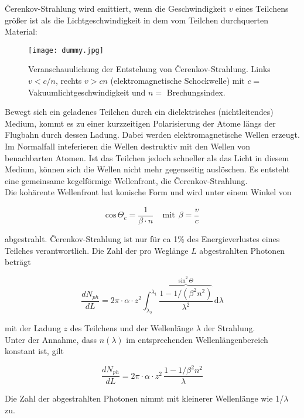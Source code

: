 \v{C}erenkov-Strahlung wird emittiert, wenn die Geschwindigkeit $v$ eines Teilchens größer ist als
die Lichtgeschwindigkeit in dem vom Teilchen durchquerten Material:

\begin{figure}[H]
	\centering
	\texttt{[image: dummy.jpg]}
	\caption{Veranschauulichung der Entstehung von \v{C}erenkov-Strahlung. Links $v<c/n$, rechts $v>cn$
	(elektromagnetische Schockwelle) mit $c=$ Vakuumlichtgeschwindigkeit und $n=$ Brechungsindex. }
\end{figure}

Bewegt sich ein geladenes Teilchen durch ein dielektrisches (nichtleitendes) Medium, kommt es zu
einer kurzzeitigen Polarisierung der Atome längs der Flugbahn durch dessen Ladung. Dabei werden
elektromagnetische Wellen erzeugt. Im Normalfall inteferieren die Wellen destruktiv mit den Wellen
von benachbarten Atomen. Ist das Teilchen jedoch schneller als das Licht in diesem Medium, können
sich die Wellen nicht mehr gegenseitig auslöschen. Es entsteht eine gemeinsame kegelförmige
Wellenfront, die \v{C}erenkov-Strahlung.
\\
Die kohärente Wellenfront hat konische Form und wird unter einem Winkel von 

\[\text{cos}\,\Theta_c=\frac{1}{\beta\cdot n}~~~~~\text{mit}~~\beta=\frac{v}{c}\]

abgestrahlt. \v{C}erenkov-Strahlung ist nur für ca 1\% des Energieverlustes eines Teilches
verantwortlich. Die Zahl der pro Weglänge $L$ abgestrahlten Photonen beträgt

\[\frac{dN_{ph}}{dL}= 2\pi\cdot\alpha\cdot z^2 \int_{\lambda_2}^{\lambda_1}
\frac{\overbrace{1-1/(\beta^2n^2)}^{\text{sin}^2\,\Theta}}{\lambda^2}\,\mathrm{d}\lambda\]

mit der Ladung $z$ des Teilchens und der Wellenlänge $\lambda$ der Strahlung. 
\\
Unter der Annahme, dass $n(\lambda)$ im entsprechenden Wellenlängenbereich konstant ist, gilt

\[\frac{dN_{ph}}{dL}= 2\pi\cdot\alpha\cdot z^2 \, \frac{1-1/\beta^2n^2}{\lambda}\]

Die Zahl der abgestrahlten Photonen nimmt mit kleinerer Wellenlänge wie 1/$\lambda$ zu.